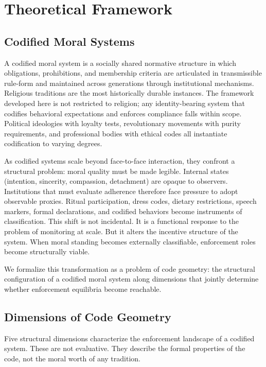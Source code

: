 \documentclass[12pt]{article}
\begin{document}
\section{Theoretical Framework}

\subsection{Codified Moral Systems}

A codified moral system is a socially shared normative structure in which obligations, prohibitions, and membership criteria are articulated in transmissible rule-form and maintained across generations through institutional mechanisms. Religious traditions are the most historically durable instances. The framework developed here is not restricted to religion; any identity-bearing system that codifies behavioral expectations and enforces compliance falls within scope. Political ideologies with loyalty tests, revolutionary movements with purity requirements, and professional bodies with ethical codes all instantiate codification to varying degrees.

As codified systems scale beyond face-to-face interaction, they confront a structural problem: moral quality must be made legible. Internal states (intention, sincerity, compassion, detachment) are opaque to observers. Institutions that must evaluate adherence therefore face pressure to adopt observable proxies. Ritual participation, dress codes, dietary restrictions, speech markers, formal declarations, and codified behaviors become instruments of classification. This shift is not incidental. It is a functional response to the problem of monitoring at scale. But it alters the incentive structure of the system. When moral standing becomes externally classifiable, enforcement roles become structurally viable.

We formalize this transformation as a problem of code geometry: the structural configuration of a codified moral system along dimensions that jointly determine whether enforcement equilibria become reachable.

\subsection{Dimensions of Code Geometry}

Five structural dimensions characterize the enforcement landscape of a codified system. These are not evaluative. They describe the formal properties of the code, not the moral worth of any tradition.
\end{document}
